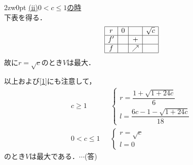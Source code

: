 \documentclass[a4j]{jarticle}
\begin{document}
\begin{multicols}{2}
\begin{indentation}{2zw}{0pt}
     \noindent\underline{(ii)$0<c\le 1$の時} \\
     下表を得る．
          \[
          \begin{array}{|c|c|c|c|}\hline
          r   &0 &     &\sqrt{c} \\ \hline
          f'  &   & +   &            \\ \hline
          f   &   &\ne &            \\ \hline 
          \end{array}
          \]    
     故に$r=\sqrt{c}$のとき$V$は最大．
     \end{indentation}

\vspace{1zh}     
以上および\eqref{1}にも注意して，
     \begin{align*}
     c\ge1&\,\,\,\,
          \begin{cases}
          r=\dfrac{1+\sqrt{1+24c}}{6} \\
          l=\dfrac{6c-1-\sqrt{1+24c}}{18} 
          \end{cases}\\
     0<c\le1&\,\,\,\,
          \begin{cases}
          r=\sqrt{c} \\
          l=0
          \end{cases}
     \end{align*}
のとき$V$は最大である．$\cdots$(答)
\newpage
\end{multicols}
\end{document}
